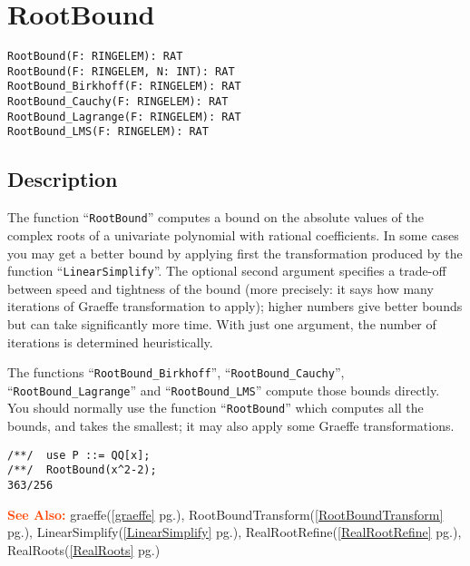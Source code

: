 \documentclass[a4paper]{mybook}
\newenvironment{command}{}{} %
\newcommand\SeeAlso{\par\textcolor{OrangeRed}{\textbf{\large See Also: }}}
\begin{document}
\section{RootBound}
\label{RootBound}
\begin{command} %


\begin{Verbatim}[label=syntax, rulecolor=\color{MidnightBlue},
frame=single]
RootBound(F: RINGELEM): RAT
RootBound(F: RINGELEM, N: INT): RAT
RootBound_Birkhoff(F: RINGELEM): RAT
RootBound_Cauchy(F: RINGELEM): RAT
RootBound_Lagrange(F: RINGELEM): RAT
RootBound_LMS(F: RINGELEM): RAT
\end{Verbatim}


\subsection*{Description}

The function ``\verb&RootBound&'' computes a bound on the absolute values
of the complex roots of a univariate polynomial with rational
coefficients.  In some cases you may get a better bound by applying
first the transformation produced by the function ``\verb&LinearSimplify&''.
The optional second argument specifies a trade-off between speed and
tightness of the bound (more precisely: it says how many iterations of
Graeffe transformation to apply); higher numbers give better bounds
but can take significantly more time.  With just one argument, the
number of iterations is determined heuristically.
\par 
The functions ``\verb&RootBound_Birkhoff&'', ``\verb&RootBound_Cauchy&'', ``\verb&RootBound_Lagrange&''
and ``\verb&RootBound_LMS&'' compute those bounds directly.  You should normally use
the function ``\verb&RootBound&'' which computes all the bounds, and takes the smallest;
it may also apply some Graeffe transformations.
\begin{Verbatim}[label=example, rulecolor=\color{PineGreen}, frame=single]
/**/  use P ::= QQ[x];
/**/  RootBound(x^2-2);
363/256
\end{Verbatim}


\SeeAlso %
  graeffe(\ref{graeffe} pg.\pageref{graeffe}), 
    RootBoundTransform(\ref{RootBoundTransform} pg.\pageref{RootBoundTransform}), 
    LinearSimplify(\ref{LinearSimplify} pg.\pageref{LinearSimplify}), 
    RealRootRefine(\ref{RealRootRefine} pg.\pageref{RealRootRefine}), 
    RealRoots(\ref{RealRoots} pg.\pageref{RealRoots})
\end{command} %
\end{document}
